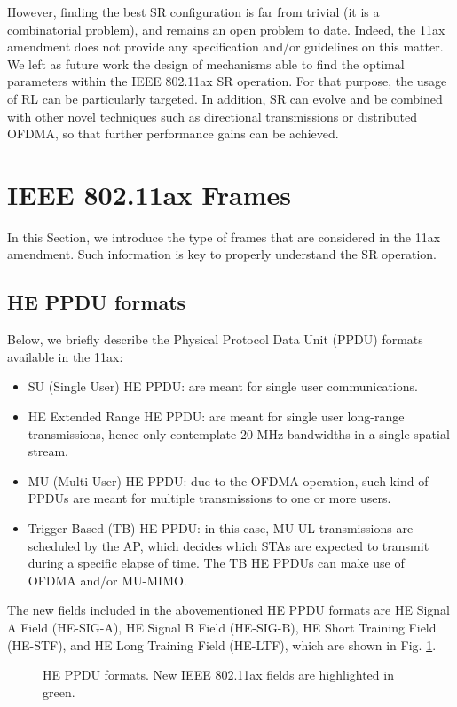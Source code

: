 \documentclass{ieeeaccess}
\begin{document}
However, finding the best SR configuration is far from trivial (it is a combinatorial problem), and remains an open problem to date. Indeed, the 11ax amendment does not provide any specification and/or guidelines on this matter. We left as future work the design of mechanisms able to find the optimal parameters within the IEEE 802.11ax SR operation. For that purpose, the usage of RL can be particularly targeted. In addition, SR can evolve and be combined with other novel techniques such as directional transmissions or distributed OFDMA, so that further performance gains can be achieved.

\appendices
\section{IEEE 802.11ax Frames}
\label{section:frames}
In this Section, we introduce the type of frames that are considered in the 11ax amendment. Such information is key to properly understand the SR operation.

\subsection{HE PPDU formats}
Below, we briefly describe the Physical Protocol Data Unit (PPDU) formats available in the 11ax:
\begin{itemize}
	\item SU (Single User) HE PPDU: are meant for single user communications.
	\item  HE Extended Range HE PPDU: are meant for single user long-range transmissions, hence only contemplate 20 MHz bandwidths in a single spatial stream.
	\item  MU (Multi-User) HE PPDU: due to the OFDMA operation, such kind of PPDUs are meant for multiple transmissions to one or more users.
	\item Trigger-Based (TB) HE PPDU: in this case, MU UL transmissions are scheduled by the AP, which decides which STAs are expected to transmit during a specific elapse of time. The TB HE PPDUs can make use of OFDMA and/or MU-MIMO.
\end{itemize}

The new fields included in the abovementioned HE PPDU formats are HE Signal A Field (HE-SIG-A), HE Signal B Field (HE-SIG-B), HE Short Training Field (HE-STF), and HE Long Training Field (HE-LTF), which are shown in Fig. \ref{fig:appendix_1}.
\begin{figure}[ht!]
	\centering
	\caption{HE PPDU formats. New IEEE 802.11ax fields are highlighted in green.}
	\label{fig:appendix_1}
\end{figure}
\end{document}
